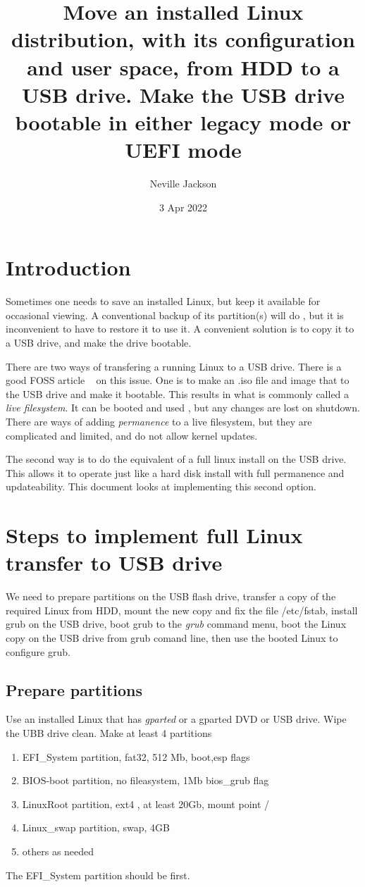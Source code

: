 \documentclass{article}  %
\title{Move an installed Linux distribution, with its configuration and user space, from HDD to a USB drive. Make the USB drive bootable in either legacy mode or UEFI mode}
\author{Neville Jackson}
\date{3 Apr 2022}
\begin{document}
 

\maketitle      

\section{Introduction} 
Sometimes one needs to save an installed Linux, but keep it available for occasional viewing. A conventional backup of its partition(s) will do , but it is inconvenient to have to restore it to use it. A convenient solution is to copy it to a USB drive, and make the drive bootable. 

There are two ways of transfering a running Linux to a USB drive. There is a good FOSS article ~\cite{foss:21} on this issue. One is to make an .iso file and image that to the USB drive and make it bootable. This results in what is commonly called a  {\em live filesystem}. It can be booted and used , but any changes are lost on shutdown. There are ways of adding {\em permanence} to a live filesystem, but they are complicated and limited, and do not allow kernel updates.

The second way  is to do  the equivalent of a full linux install on the USB drive. This allows it  to operate just like a hard disk install with full permanence and updateability. This document looks at implementing this second option.

\section{Steps to implement full Linux transfer to USB drive}
We need to prepare partitions on the USB flash drive, transfer a copy of the required Linux from HDD, mount the new copy and fix the file /etc/fstab, install grub on the USB drive, boot grub to the {\em grub} command menu, boot the Linux copy on the USB drive from grub comand line, then use the booted Linux to configure grub.

\subsection{Prepare partitions}
Use an installed Linux that has {\em gparted} or a gparted DVD or USB drive. Wipe the UBB drive clean. Make at least 4 partitions
\begin{enumerate}
\item EFI\_System  partition, fat32, 512 Mb, boot,esp flags
\item BIOS-boot partition, no fileasystem, 1Mb bios\_grub flag
\item LinuxRoot partition, ext4 , at least 20Gb, mount point /
\item Linux\_swap partition, swap, 4GB
\item others as needed
\end{enumerate}
The EFI\_System  partition should be first. 
\end{document}
